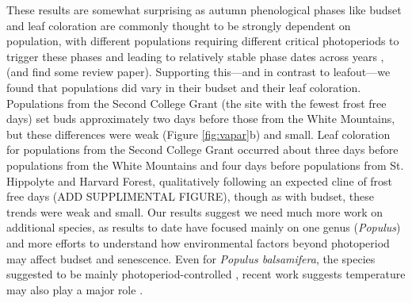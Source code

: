 \documentclass{article}[12pt]
\begin{document}
These results are somewhat surprising as autumn phenological phases like budset and leaf coloration are commonly thought to be strongly dependent on population, with different populations requiring different critical photoperiods to trigger these phases and leading to relatively stable phase dates across years \citep{soolanayakanahally2013timing}, (and find some review paper). Supporting this---and in contrast to leafout---we found that populations did vary in their budset and their leaf coloration. Populations from the Second College Grant (the site with the fewest frost free days) set buds approximately two days before those from the White Mountains, but these differences were weak (Figure \ref{fig:vapar}b) and small. Leaf coloration for populations from the Second College Grant occurred about three days before populations from the White Mountains and four days before populations from St. Hippolyte and Harvard Forest, qualitatively following an expected cline of frost free days (ADD SUPPLIMENTAL FIGURE), though as with budset, these trends were weak and small. Our results suggest we need much more work on additional species, as results to date have focused mainly on one genus (\emph{Populus}) and more efforts to understand how environmental factors beyond photoperiod may affect budset and senescence. Even for \emph{Populus balsamifera}, the species
suggested to be mainly photoperiod-controlled %
, recent work suggests temperature may also play a major role \citep{Michelson2018}.   
\end{document}
